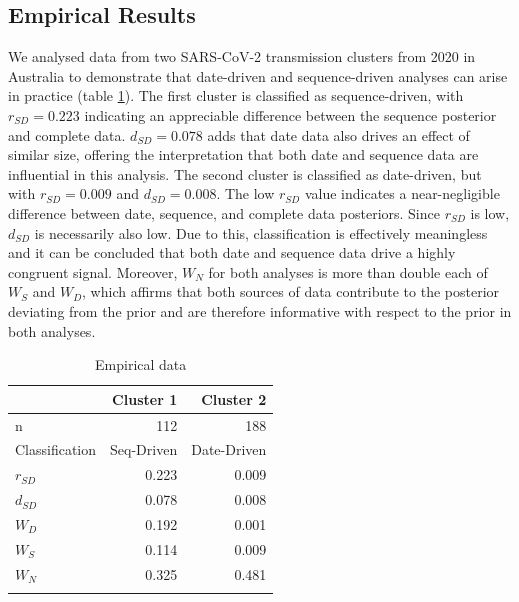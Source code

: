 \documentclass{article}
\begin{document}
\subsection*{Empirical Results}
We analysed data from two SARS-CoV-2 transmission clusters from 2020 in Australia to demonstrate that date-driven and sequence-driven analyses can arise in practice (table \ref{tab:tab2}). The first cluster is classified as sequence-driven, with $r_{SD} = 0.223$ indicating an appreciable difference between the sequence posterior and complete data. $d_{SD} = 0.078$ adds that date data also drives an effect of similar size, offering the interpretation that both date and sequence data are influential in this analysis. The second cluster is  classified as date-driven, but with $r_{SD} = 0.009$ and $d_{SD}=0.008$. The low $r_{SD}$ value indicates a near-negligible difference between date, sequence, and complete data posteriors. Since $r_{SD}$ is low, $d_{SD}$ is necessarily also low. Due to this, classification is effectively meaningless and it can be concluded that both date and sequence data drive a highly congruent signal. Moreover, $W_N$ for both analyses is more than double each of $W_S$ and $W_D$, which affirms that both sources of data contribute to the posterior deviating from the prior and are therefore informative with respect to the prior in both analyses.

\begin{table}[H]
\centering
\caption{Empirical data}
\begin{tabular}{lrr}
                    &   Cluster 1      &   Cluster 2     \\
\midrule
n                   &   112             &   188             \\
Classification      &   Seq-Driven       &   Date-Driven    \\
$r_{SD}$          &   0.223            &   0.009          \\
$d_{SD}$          &   0.078           &   0.008          \\
$W_{D}$             &   0.192            &   0.001          \\
$W_{S}$             &   0.114            &   0.009          \\
$W_{N}$             &   0.325            &   0.481          \\
\bottomrule 
\label{tab:tab2}
\end{tabular}
\end{table}
\end{document}
